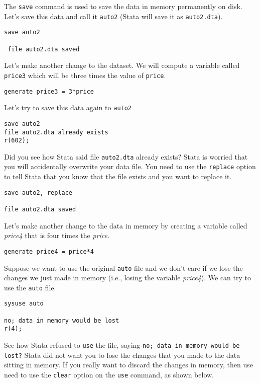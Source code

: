 The \lstinline{save} command is used to save the data in memory permanently on disk. Let's save this data and call it \lstinline{auto2} (Stata will save it as \lstinline{auto2.dta}).

\begin{lstlisting}
save auto2

 file auto2.dta saved
\end{lstlisting}

Let's make another change to the dataset. We will compute a variable called \lstinline{price3} which will be three times the value of \lstinline{price}.

\begin{lstlisting}
generate price3 = 3*price
\end{lstlisting}

Let's try to save this data again to \lstinline{auto2}

\begin{lstlisting}
save auto2
file auto2.dta already exists
r(602);
\end{lstlisting}

Did you see how Stata said file \lstinline{auto2.dta} already exists? Stata is worried that you will accidentally overwrite your data file. You need to use the \lstinline{replace} option to tell Stata that you know that the file exists and you want to replace it.

\begin{lstlisting}
save auto2, replace

file auto2.dta saved
\end{lstlisting}

Let's make another change to the data in memory by creating a variable called \textit{price4} that is four times the \textit{price}.

\begin{lstlisting}
generate price4 = price*4
\end{lstlisting}

Suppose we want to use the original \lstinline{auto} file and we don't care if we lose the changes we just made in memory (i.e., losing the variable \textit{price4}). We can try to use the \lstinline{auto} file.

\begin{lstlisting}
sysuse auto

no; data in memory would be lost
r(4);
\end{lstlisting}

See how Stata refused to \lstinline{use} the file, saying \lstinline{no; data in memory would be lost?} Stata did not want you to lose the changes that you made to the data sitting in memory. If you really want to discard the changes in memory, then use need to use the \lstinline{clear} option on the \lstinline{use} command, as shown below.

